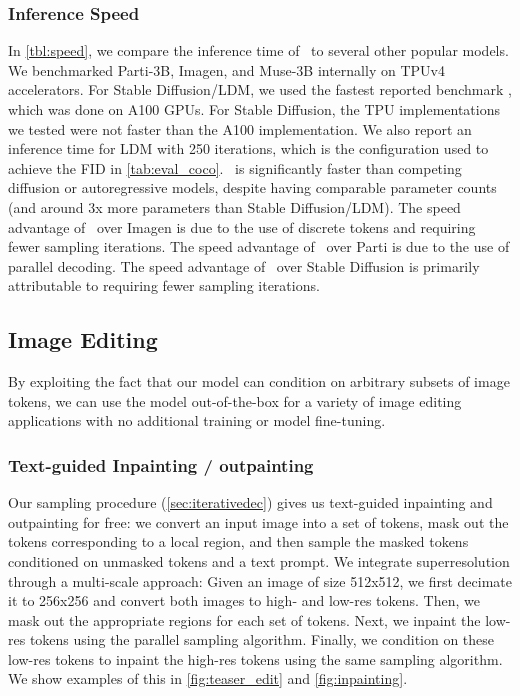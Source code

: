 \subsubsection{Inference Speed}
\label{sec:speed}
In \cref{tbl:speed}, we compare the inference time of \name~to several other popular models. We benchmarked Parti-3B, Imagen, and Muse-3B internally on TPUv4 accelerators. 
For Stable Diffusion/LDM, we used the fastest reported benchmark \cite{sdinference}, which was done on A100 GPUs. For Stable Diffusion, the TPU implementations we tested were not faster than the A100 implementation. We also report an inference time for LDM with 250 iterations, which is the configuration used to achieve the FID in \cref{tab:eval_coco}. \name~is significantly faster than competing diffusion or autoregressive models, despite having comparable parameter counts (and around 3x more parameters than Stable Diffusion/LDM). The speed advantage of \name~over Imagen is due to the use of discrete tokens and requiring fewer sampling iterations. The speed advantage of \name~over Parti is due to the use of parallel decoding. The speed advantage of \name~over Stable Diffusion is primarily attributable to requiring fewer sampling iterations. 
\subsection{Image Editing}
\label{sec:editing}
By exploiting the fact that our model can condition on arbitrary subsets of image tokens, we can use the model out-of-the-box for a variety of image editing applications with no additional training or model fine-tuning.

\subsubsection{Text-guided Inpainting / outpainting}
Our sampling procedure (\cref{sec:iterativedec}) gives us text-guided inpainting and outpainting for free: we convert an input image into a set of tokens, mask out the tokens corresponding to a local region, and then sample the masked tokens conditioned on unmasked tokens and a text prompt. We integrate superresolution through a multi-scale approach: Given an image of size 512x512, we first decimate it to 256x256 and convert both images to high- and low-res tokens. Then, we mask out the appropriate regions for each set of tokens. Next, we inpaint the low-res tokens using the parallel sampling algorithm. Finally, we condition on these low-res tokens to inpaint the high-res tokens using the same sampling algorithm. We show examples of this in \cref{fig:teaser_edit} and \cref{fig:inpainting}.

